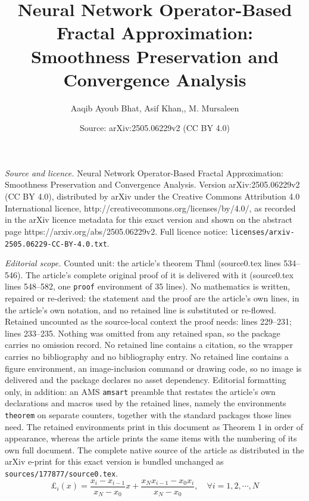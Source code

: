 \documentclass[10pt,a4paper]{amsart}
\title{\Large Neural Network Operator-Based Fractal Approximation: Smoothness Preservation and Convergence Analysis}
\author{Aaqib Ayoub Bhat, Asif Khan,, M. Mursaleen}
\date{Source: arXiv:2505.06229v2 (CC BY 4.0)}
\begin{document}
\maketitle

\noindent\emph{Source and licence.} \Large Neural Network Operator-Based Fractal Approximation: Smoothness Preservation and Convergence Analysis. Version arXiv:2505.06229v2 (CC BY 4.0), distributed by arXiv under the Creative Commons Attribution 4.0 International licence, http://creativecommons.org/licenses/by/4.0/, as recorded in the arXiv licence metadata for this exact version and shown on the abstract page https://arxiv.org/abs/2505.06229v2. Full licence notice: \texttt{licenses/arxiv-2505.06229-CC-BY-4.0.txt}.\par\smallskip

\noindent\textit{Editorial scope.} Counted unit: the article's theorem Thml (source0.tex lines 534--546). The article's complete original proof of it is delivered with it (source0.tex lines 548--582, one \texttt{proof} environment of 35 lines). No mathematics is written, repaired or re-derived: the statement and the proof are the article's own lines, in the article's own notation, and no retained line is substituted or re-flowed.  Retained uncounted as the source-local context the proof needs: lines 229--231; lines 233--235.  Nothing was omitted from any retained span, so the package carries no omission record.  No retained line contains a citation, so the wrapper carries no bibliography and no bibliography entry.  No retained line contains a figure environment, an image-inclusion command or drawing code, so no image is delivered and the package declares no asset dependency.  Editorial formatting only, in addition: an AMS \texttt{amsart} preamble that restates the article's own declarations and macros used by the retained lines, namely the environments \texttt{theorem} on separate counters, together with the standard packages those lines need.  The retained environments print in this document as Theorem 1 in order of appearance, whereas the article prints the same items with the numbering of its own full document.  The complete native source of the article as distributed in the arXiv e-print for this exact version is bundled unchanged as \texttt{sources/177877/source0.tex}.
	\begin{equation}\label{defli}
		\pounds_i(x)= \frac{x_i -x_{i-1}}{x_N-x_0}x +\frac{x_N x_{i-1} -x_0 x_i}{x_N-x_0}, \quad \forall i=1,2,\cdots,N
	\end{equation}
\end{document}
